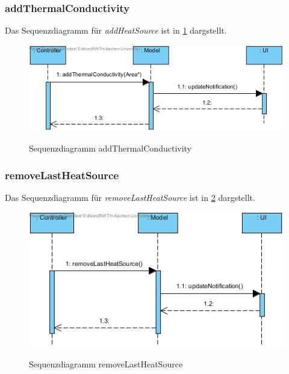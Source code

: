 \subsubsection*{addThermalConductivity}

Das Sequenzdiagramm für \emph{addHeatSource} ist in \ref{Sequenzdiagramm addThermalConductivity} dargstellt.

\begin{figure}[H]
	\centering
	\includegraphics[scale=.6]{Bilder/Model__addThermalConductivity().jpg}\\
	\caption{Sequenzdiagramm addThermalConductivity}
	\label{Sequenzdiagramm addThermalConductivity}
\end{figure}

\subsubsection*{removeLastHeatSource}

Das Sequenzdiagramm für \emph{removeLastHeatSource} ist in \ref{Sequenzdiagramm removeLastHeatSource} dargstellt.

\begin{figure}[H]
	\centering
	\includegraphics[scale=.6]{Bilder/Model__removeLastHeatSource().jpg}\\
	\caption{Sequenzdiagramm removeLastHeatSource}
	\label{Sequenzdiagramm removeLastHeatSource}
\end{figure}

